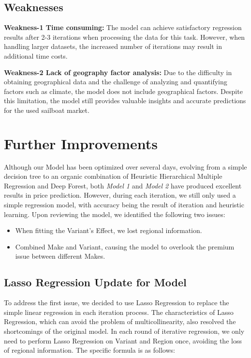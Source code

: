 \documentclass[12pt]{article}  %
\begin{document}
\subsection{Weaknesses}
\textbf{Weakness-1 Time consuming:}
The model can achieve satisfactory regression results after 2-3 iterations when processing the data for this task. However, when handling larger datasets, the increased number of iterations may result in additional time costs.

\textbf{Weakness-2 Lack of geography  factor analysis:}
Due to the difficulty in obtaining geographical data and the challenge of analyzing and quantifying factors such as climate, the model does not include geographical factors. Despite this limitation, the model still provides valuable insights and accurate predictions for the used sailboat market.

\section{Further Improvements}
Although our Model has been optimized over several days, evolving from a simple decision tree to an organic combination of Heuristic Hierarchical Multiple Regression and Deep Forest, both \emph{Model 1} and \emph{Model 2} have produced excellent results in price prediction. However, during each iteration, we still only used a simple regression model, with accuracy being the result of iteration and heuristic learning. Upon reviewing the model, we identified the following two issues:
\begin{itemize}
    \item When fitting the Variant's Effect, we lost regional information.
    \item Combined Make and Variant, causing the model to overlook the premium issue between different Makes.
\end{itemize}
\subsection{Lasso Regression Update for Model}
To address the first issue, we decided to use Lasso Regression to replace the simple linear regression in each iteration process. The characteristics of Lasso Regression, which can avoid the problem of multicollinearity, also resolved the shortcomings of the original model. In each round of iterative regression, we only need to perform Lasso Regression on Variant and Region once, avoiding the loss of regional information. The specific formula is as follows:
\end{document}
